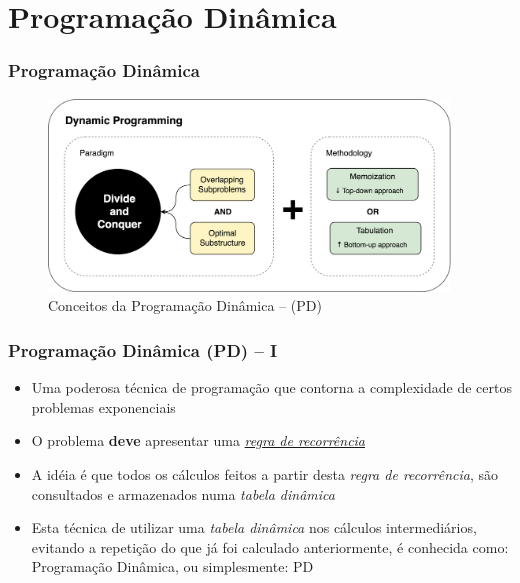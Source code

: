 
       
\section{Programação Dinâmica}
\begin{frame}[fragile]
\frametitle{Programação Dinâmica}

\begin{figure}[!htb]
\centering
\includegraphics[width=0.95\textwidth, height=0.70\textheight]{figures/ilustra_PD.png}
\caption{Conceitos da Programação Dinâmica -- (PD)}
\end{figure}
\end{frame}


\begin{frame}[fragile]

    \frametitle{Programação Dinâmica (PD) -- I}

   \begin{block}{}
     \begin{itemize}
      \item Uma poderosa técnica de programação que  contorna a complexidade de certos problemas
      exponenciais
      
       \pause
       \item O problema \textbf{deve} apresentar uma \textit{\underline{regra de recorrência}}
       
      \pause
      \item A idéia é que todos os cálculos feitos a partir desta \textit{regra de recorrência},
      são consultados e armazenados numa \textit{tabela dinâmica}
      
      \pause
      \item Esta técnica de utilizar uma \textit{tabela dinâmica} nos cálculos intermediários,
      evitando a repetição do que já foi calculado anteriormente, é conhecida como:
      Programação Dinâmica, ou simplesmente: PD

    \end{itemize}
    
    \end{block}
    
\end{frame}




